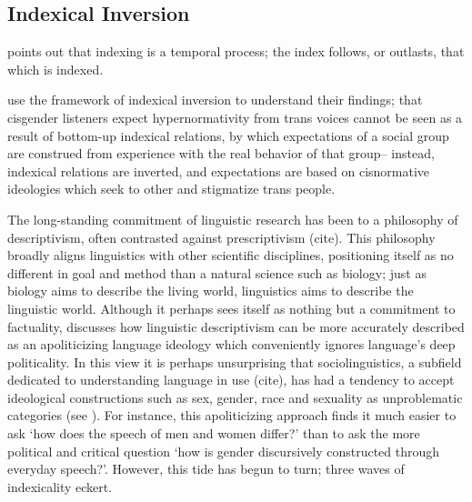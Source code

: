 \subsection{Indexical Inversion}
\textcite{inoue_what_2004} points out that indexing is a temporal process; the index follows, or outlasts, that which is indexed.

\textcite{jessee_cisgender_2025} use the framework of indexical inversion to understand their findings; that cisgender listeners expect hypernormativity from trans voices cannot be seen as a result of bottom-up indexical relations, by which expectations of a social group are construed from experience with the real behavior of that group-- instead, indexical relations are inverted, and expectations are based on cisnormative ideologies which seek to other and stigmatize trans people. 


    
























    The long-standing commitment of linguistic research has been to a philosophy of descriptivism, often contrasted against prescriptivism (cite). This philosophy broadly aligns linguistics with other scientific disciplines, positioning itself as no different in goal and method than a natural science such as biology; just as biology aims to describe the living world, linguistics aims to describe the linguistic world. Although it perhaps sees itself as nothing but a commitment to factuality, \textcite{zimman_beyond_2021} discusses how linguistic descriptivism can be more accurately described as an apoliticizing language ideology which conveniently ignores language's deep politicality. In this view it is perhaps unsurprising that sociolinguistics, a subfield dedicated to understanding language in use (cite), has had a tendency to accept ideological constructions such as sex, gender, race and sexuality as unproblematic categories (see \cite{livia_its_1997}). For instance, this apoliticizing approach finds it much easier to ask `how does the speech of men and women differ?' than to ask the more political and critical question `how is gender discursively constructed through everyday speech?'. However, this tide has begun to turn;  three waves of indexicality eckert.
